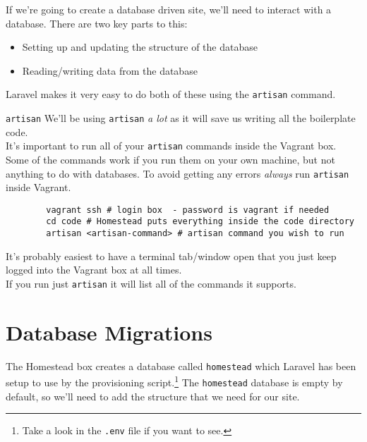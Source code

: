 If we're going to create a database driven site, we'll need to interact with a database. There are two key parts to this:

\begin{itemize}
    \item Setting up and updating the structure of the database
    \item Reading/writing data from the database
\end{itemize}

Laravel makes it very easy to do both of these using the \texttt{artisan} command.
\\

\begin{infobox}{\texttt{artisan}}
    We'll be using \texttt{artisan} \textit{a lot} as it will save us writing all the boilerplate code.
    \\

    It's important to run all of your \texttt{artisan} commands inside the Vagrant box. Some of the commands work if you run them on your own machine, but not anything to do with databases. To avoid getting any errors \textit{always} run \texttt{artisan} inside Vagrant.

    \begin{verbatim}
        vagrant ssh # login box  - password is vagrant if needed
        cd code # Homestead puts everything inside the code directory
        artisan <artisan-command> # artisan command you wish to run
    \end{verbatim}

    It's probably easiest to have a terminal tab/window open that you just keep logged into the Vagrant box at all times.
    \\

    If you run just \texttt{artisan} it will list all of the commands it supports.
\end{infobox}



\section{Database Migrations}

The Homestead box creates a database called \texttt{homestead} which Laravel has been setup to use by the provisioning script.\footnote{Take a look in the \texttt{.env} file if you want to see.} The \texttt{homestead} database is empty by default, so we'll need to add the structure that we need for our site.
\\

